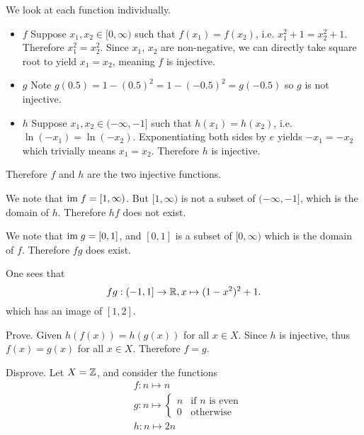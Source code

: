 \begin{questions}
    \item \begin{partquestions}{\alph*}
        \item We look at each function individually.
        \begin{itemize}
            \item $\boxed{f}$ Suppose $x_1,x_2 \in [0,\infty)$ such that $f(x_1) = f(x_2)$, i.e. $x_1^2 + 1 = x_2^2 + 1$. Therefore $x_1^2 = x_2^2$. Since $x_1$, $x_2$ are non-negative, we can directly take square root to yield $x_1 = x_2$, meaning $f$ is injective.
            \item $\boxed{g}$ Note $g(0.5) = 1-(0.5)^2 = 1 - (-0.5)^2 = g(-0.5)$ so $g$ is not injective.
            \item $\boxed{h}$ Suppose $x_1,x_2 \in (-\infty, -1]$ such that $h(x_1) = h(x_2)$, i.e. $\ln(-x_1) = \ln(-x_2)$. Exponentiating both sides by $e$ yields $-x_1 = -x_2$ which trivially means $x_1 = x_2$. Therefore $h$ is injective.
        \end{itemize}
        Therefore $f$ and $h$ are the two injective functions.

        \item We note that $\mathrm{im}\; f = [1, \infty)$. But $[1, \infty)$ is not a subset of $(-\infty, -1]$, which is the domain of $h$. Therefore $hf$ does not exist.
        
        \item We note that $\mathrm{im}\; g = [0, 1]$, and $[0, 1]$ is a subset of $[0, \infty)$ which is the domain of $f$. Therefore $fg$ does exist.
        
        One sees that
        \[
            fg: (-1, 1] \to \mathbb{R}, x \mapsto (1-x^2)^2 + 1.
        \]
        which has an image of $[1, 2]$.
    \end{partquestions}
    
    \item \begin{partquestions}{\alph*}
        \item Prove. Given $h(f(x)) = h(g(x))$ for all $x \in X$. Since $h$ is injective, thus $f(x) = g(x)$ for all $x \in X$. Therefore $f = g$.
        \item Disprove. Let $X = \mathbb{Z}$, and consider the functions
        \begin{align*}
            &f: n \mapsto n\\
            &g: n \mapsto \begin{cases}
                n & \text{if } n \text{ is even}\\
                0 & \text{otherwise}
            \end{cases}\\
            &h: n \mapsto 2n
        \end{align*}
        

\end{partquestions}
\end{questions}
